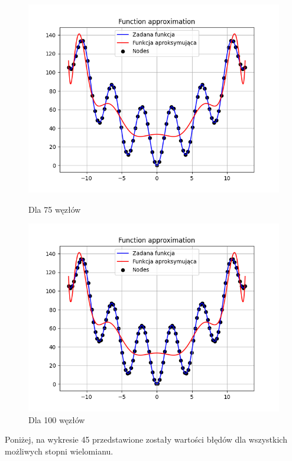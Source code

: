 \documentclass{article}
\begin{document}
\begin{figure}[H]
\begin{minipage}[b]{0.49\textwidth}
    \begin{minipage}[b]{\textwidth}
      \includegraphics[width=\textwidth]{img43.png}
      \caption{Dla 75 węzłów}
    \end{minipage}
    \vspace*{\fill}
    \begin{minipage}[b]{\textwidth}
      \includegraphics[width=\textwidth]{img44.png}
      \caption{Dla 100 węzłów}
    \end{minipage}
  \end{minipage}
\end{figure}

Poniżej, na wykresie 45 przedstawione zostały wartości błędów dla wszystkich możliwych stopni wielomianu.
\end{document}

